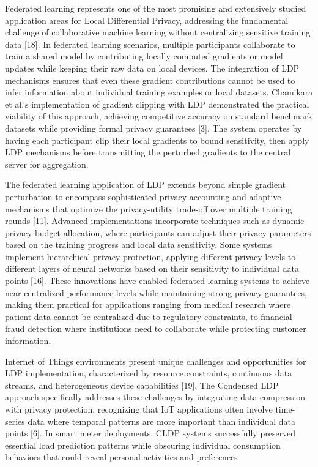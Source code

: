 \documentclass[conference]{IEEEtran}
\begin{document}
Federated learning represents one of the most promising and extensively studied application areas for Local Differential Privacy, addressing the fundamental challenge of collaborative machine learning without centralizing sensitive training data [18]. In federated learning scenarios, multiple participants collaborate to train a shared model by contributing locally computed gradients or model updates while keeping their raw data on local devices. The integration of LDP mechanisms ensures that even these gradient contributions cannot be used to infer information about individual training examples or local datasets. Chamikara et al.'s implementation of gradient clipping with LDP demonstrated the practical viability of this approach, achieving competitive accuracy on standard benchmark datasets while providing formal privacy guarantees [3]. The system operates by having each participant clip their local gradients to bound sensitivity, then apply LDP mechanisms before transmitting the perturbed gradients to the central server for aggregation.

The federated learning application of LDP extends beyond simple gradient perturbation to encompass sophisticated privacy accounting and adaptive mechanisms that optimize the privacy-utility trade-off over multiple training rounds [11]. Advanced implementations incorporate techniques such as dynamic privacy budget allocation, where participants can adjust their privacy parameters based on the training progress and local data sensitivity. Some systems implement hierarchical privacy protection, applying different privacy levels to different layers of neural networks based on their sensitivity to individual data points [16]. These innovations have enabled federated learning systems to achieve near-centralized performance levels while maintaining strong privacy guarantees, making them practical for applications ranging from medical research where patient data cannot be centralized due to regulatory constraints, to financial fraud detection where institutions need to collaborate while protecting customer information.

Internet of Things environments present unique challenges and opportunities for LDP implementation, characterized by resource constraints, continuous data streams, and heterogeneous device capabilities [19]. The Condensed LDP approach specifically addresses these challenges by integrating data compression with privacy protection, recognizing that IoT applications often involve time-series data where temporal patterns are more important than individual data points [6]. In smart meter deployments, CLDP systems successfully preserved essential load prediction patterns while obscuring individual consumption behaviors that could reveal personal activities and preferences
\end{document}
